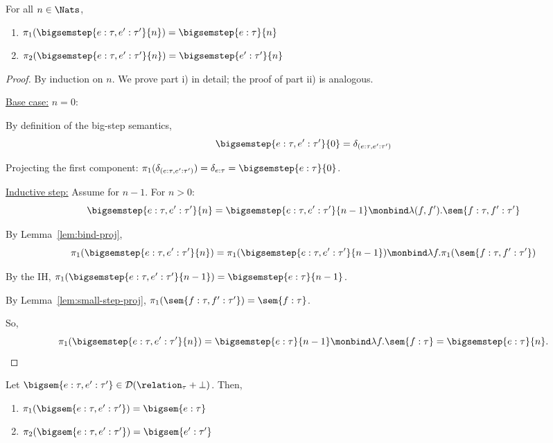 \begin{lemma}
	For all $n \in \Nats$, 
	\begin{enumerate}
		\item $\pi_1(\bigsemstep{e : \tau,e' : \tau'}{n}) = \bigsemstep{e : \tau}{n}$
		\item $\pi_2(\bigsemstep{e : \tau,e' : \tau'}{n}) = \bigsemstep{e' : \tau'}{n}$
	\end{enumerate}
\end{lemma}

\begin{proof}
	By induction on $n$. We prove part i) in detail; the proof of part ii) is analogous.

	\underline{Base case:} $n=0$:

	By definition of the big-step semantics, 
	\[
		\bigsemstep{e : \tau, e' : \tau'}{0} = \delta_{(e : \tau, e' : \tau')}
	\]

	Projecting the first component: $\pi_1(\delta_{(e : \tau, e' : \tau')}) = \delta_{e : \tau} = \bigsemstep{e : \tau}{0}$.

	\underline{Inductive step:} Assume for $n-1$. For $n > 0$:
	\[
		\bigsemstep{e : \tau, e' : \tau'}{n} = \bigsemstep{e : \tau, e' : \tau'}{n-1} \monbind  \lambda (f,f'). \sem{f : \tau, f' : \tau'}
	\]

	By Lemma~\ref{lem:bind-proj},
	\[
		\pi_1(\bigsemstep{e : \tau, e' : \tau'}{n}) = \pi_1(\bigsemstep{e : \tau, e' : \tau'}{n-1}) \monbind  \lambda f. \pi_1(\sem{f : \tau, f' : \tau'})
	\]

	By the IH, $\pi_1(\bigsemstep{e : \tau, e' : \tau'}{n-1}) = \bigsemstep{e : \tau}{n-1}$.

	By Lemma~\ref{lem:small-step-proj}, $\pi_1(\sem{f : \tau, f' : \tau'}) = \sem{f : \tau}$.

	So,
	\[
		\pi_1(\bigsemstep{e : \tau, e' : \tau'}{n}) = \bigsemstep{e : \tau}{n-1} \monbind \lambda f.\sem{f : \tau} = \bigsemstep{e : \tau}{n}.
	\]
\end{proof}

\begin{lemma}\label{lem:big-step-proj}
	Let $\bigsem{e : \tau, e' : \tau'} \in \mathcal{D}(\relation_{\tau} + \bot)$. Then,
	\begin{enumerate}
		\item $\pi_1(\bigsem{e : \tau, e' : \tau'}) = \bigsem{e : \tau}$
		\item $\pi_2(\bigsem{e : \tau, e' : \tau'}) = \bigsem{e' : \tau'}$
	\end{enumerate}
\end{lemma}

